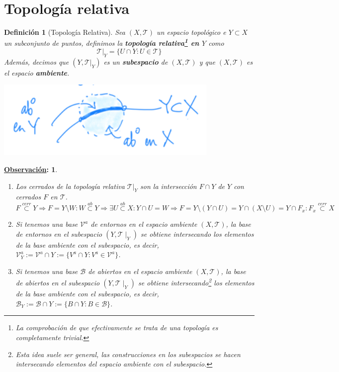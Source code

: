 \documentclass[10pt,a4paper,openright]{book}
\theoremstyle{break}
\newtheorem*{defi}{Definición}
\newtheorem*{obs}{\underline{Observación}:}
\begin{document}
\section{Topología relativa}%
\label{sec:topologia_relativa}
\begin{defi}[Topología Relativa]
Sea $\left( X, \mathcal{T} \right)$ un espacio topológico e $Y \subset X$ un subconjunto de puntos, definimos la \textbf{topología relativa\footnote{La comprobación de que efectivamente se trata de una topología es completamente trivial.} en $Y$} como
$$
\mathcal{T}|_Y = \{U \cap Y: U \in \mathcal{T}\}
$$
Además, decimos que $\left( Y, \mathcal{T}|_Y \right)$ es un \textbf{subespacio} de $\left( X, \mathcal{T} \right)$ y que $\left( X, \mathcal{T} \right)$ es el espacio \textbf{ambiente}. 
\begin{center}
    \includegraphics[scale=0.3]{images/def_subespacio_top} 
\end{center}
\end{defi}

\begin{obs}
\begin{enumerate}
    \item Los cerrados de la topología relativa $\mathcal{T}|_Y$ son la intersección $F\cap Y$ de $Y$ con cerrados $F$ en $\mathcal{T}$.
    $$
    F \stackrel{cerr}{\subset} Y \Rightarrow F = Y\setminus W : W \stackrel{ab}{\subset} Y \Rightarrow \exists U \stackrel{ab}{\subset}X : Y\cap U = W \Rightarrow F = Y \setminus (Y \cap U) = Y \cap  (X\setminus U) = Y \cap F_x : F_x \stackrel{cerr}{\subset} X
    $$
    \item Si tenemos una base $\mathcal{V}^a$ de entornos en el espacio ambiente $(X,\mathcal{T})$, la base de entornos en el subespacio $(Y,\mathcal{T}\mid_Y)$ se obtiene intersecando los elementos de la base ambiente con el subespacio, es decir, $\mathcal{V}^a_Y := \mathcal{V}^a \cap Y := \{V^a \cap Y : V^a \in \mathcal{V}^a\}$.

    \item Si tenemos una base $\mathcal{B}$ de abiertos en el espacio ambiente $(X,\mathcal{T})$, la base de abiertos en el subespacio $(Y,\mathcal{T}\mid_Y)$ se obtiene intersecando\footnote{Esta idea suele ser general, las construcciones en los subespacios se hacen intersecando elementos del espacio ambiente con el subespacio.} los elementos de la base ambiente con el subespacio, es decir, $\mathcal{B}_Y := \mathcal{B} \cap Y := \{B \cap Y : B \in \mathcal{B}\}$.
\end{enumerate}
\end{obs}
\end{document}
